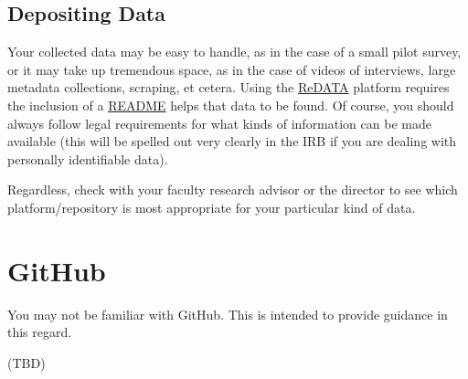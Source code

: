 \documentclass[]{tufte-book}
\begin{document}
\hypertarget{depositing-data}{%
\section{Depositing Data}\label{depositing-data}}

Your collected data may be easy to handle, as in the case of a small pilot survey, or it may take up tremendous space, as in the case of videos of interviews, large metadata collections, scraping, et cetera. Using the \protect\hyperlink{redata}{ReDATA} platform requires the inclusion of a \href{https://osf.io/sj8xv/}{README} helps that data to be found. Of course, you should always follow legal requirements for what kinds of information can be made available (this will be spelled out very clearly in the IRB if you are dealing with personally identifiable data).

Regardless, check with your faculty research advisor or the director to see which platform/repository is most appropriate for your particular kind of data.

\hypertarget{github}{%
\chapter{GitHub}\label{github}}

You may not be familiar with GitHub. This is intended to provide guidance in this regard.

(TBD)

\printindex


\end{document}
